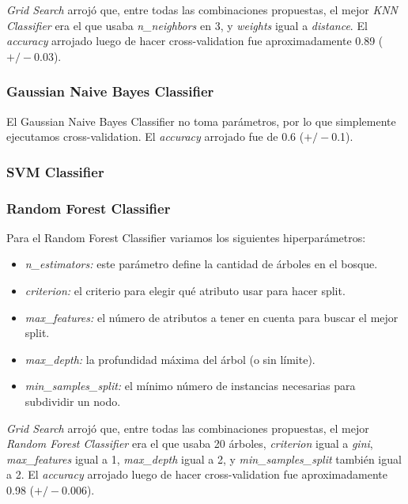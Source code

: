 \documentclass[a4paper]{article}
\begin{document}
\textit{Grid Search} arrojó que, entre todas las combinaciones propuestas, el mejor \textit{KNN Classifier} era el que usaba \textit{n\_neighbors} en 3, y \textit{weights} igual a \textit{distance}. \newline
\indent El \textit{accuracy} arrojado luego de hacer cross-validation fue aproximadamente 0.89 ($+/-$0.03).

\subsubsection{Gaussian Naive Bayes Classifier}
El Gaussian Naive Bayes Classifier no toma parámetros, por lo que simplemente ejecutamos cross-validation. El \textit{accuracy} arrojado fue de 0.6 ($+/-$0.1).

\subsubsection{SVM Classifier}

\subsubsection{Random Forest Classifier}
Para el Random Forest Classifier variamos los siguientes hiperparámetros:
\begin{itemize}
	\item \textit{n_estimators:} este parámetro define la cantidad de árboles en el bosque.
	\item \textit{criterion:} el criterio para elegir qué atributo usar para hacer split.
	\item \textit{max\_features:} el número de atributos a tener en cuenta para buscar el mejor split.
	\item \textit{max\_depth:} la profundidad máxima del árbol (o sin límite).
	\item \textit{min\_samples\_split:} el mínimo número de instancias necesarias para subdividir un nodo.
\end{itemize}

\textit{Grid Search} arrojó que, entre todas las combinaciones propuestas, el mejor \textit{Random Forest Classifier} era el que usaba 20 árboles, \textit{criterion} igual a \textit{gini}, \textit{max\_features} igual a 1, \textit{max\_depth} igual a 2, y \textit{min\_samples\_split} también igual a 2. \newline
\indent El \textit{accuracy} arrojado luego de hacer cross-validation fue aproximadamente 0.98 ($+/-$0.006).
\end{document}
